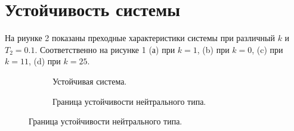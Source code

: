 \documentclass[a4paper, 11pt]{article}
\begin{document}
\section*{Устойчивость системы}
На риунке 2 показаны преходные характеристики системы при различный $k$ и $T_2 = 0.1$. Соответственно на рисунке 1 (а) при $k = 1$, (b) при $k = 0$, (c) при $k = 11$, (d) при $k = 25$.
\begin{figure}[h!]
    \begin{subfigure}[b]{0.5\textwidth} 
        \centering
        \caption{Устойчивая система.}
    \end{subfigure}
    \begin{subfigure}[b]{0.5\textwidth} 
        \centering
       \caption{Граница устойчивости нейтрального типа.}
    \end{subfigure}

    \vspace{0.5cm} 


\end{figure}
\end{document}
